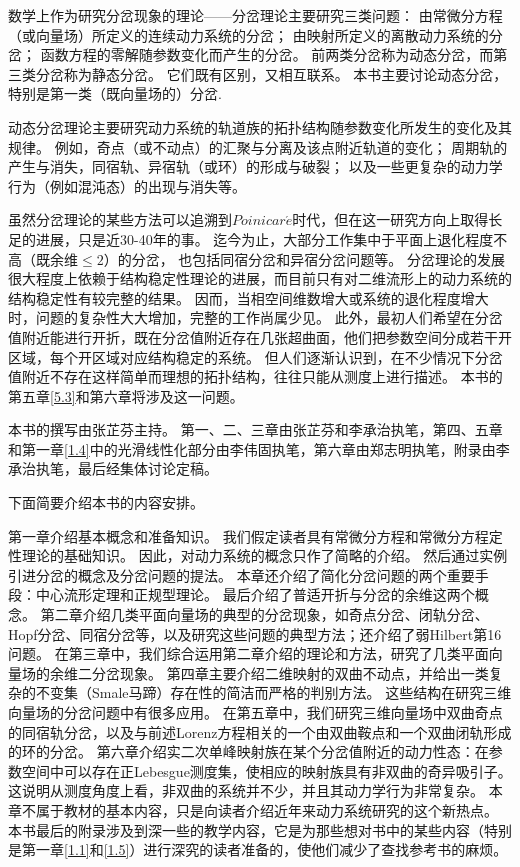 数学上作为研究分岔现象的理论——分岔理论主要研究三类问题：
由常微分方程（或向量场）所定义的连续动力系统的分岔；
由映射所定义的离散动力系统的分岔；
函数方程的零解随参数变化而产生的分岔。
前两类分岔称为动态分岔，而第三类分岔称为静态分岔。
它们既有区别，又相互联系。
本书主要讨论动态分岔，特别是第一类（既向量场的）分岔.


动态分岔理论主要研究动力系统的轨道族的拓扑结构随参数变化所发生的变化及其规律。
例如，奇点（或不动点）的汇聚与分离及该点附近轨道的变化；
周期轨的产生与消失，同宿轨、异宿轨（或环）的形成与破裂；
以及一些更复杂的动力学行为（例如混沌态）的出现与消失等。


虽然分岔理论的某些方法可以追溯到$Poinicar\acute{e}$时代，但在这一研究方向上取得长足的进展，只是近30-40年的事。
迄今为止，大部分工作集中于平面上退化程度不高（既余维\(\leq 2\)）的分岔，
也包括同宿分岔和异宿分岔问题等。
分岔理论的发展很大程度上依赖于结构稳定性理论的进展，而目前只有对二维流形上的动力系统的结构稳定性有较完整的结果。
因而，当相空间维数增大或系统的退化程度增大时，问题的复杂性大大增加，完整的工作尚属少见。
此外，最初人们希望在分岔值附近能进行开折，既在分岔值附近存在几张超曲面，他们把参数空间分成若干开区域，每个开区域对应结构稳定的系统。
但人们逐渐认识到，在不少情况下分岔值附近不存在这样简单而理想的拓扑结构，往往只能从测度上进行描述。
本书的第五章\ref{5.3}和第六章将涉及这一问题。


本书的撰写由张芷芬主持。
第一、二、三章由张芷芬和李承治执笔，第四、五章和第一章\ref{1.4}中的光滑线性化部分由李伟固执笔，第六章由郑志明执笔，附录由李承治执笔，最后经集体讨论定稿。


下面简要介绍本书的内容安排。


第一章介绍基本概念和准备知识。
我们假定读者具有常微分方程和常微分方程定性理论的基础知识。
因此，对动力系统的概念只作了简略的介绍。
然后通过实例引进分岔的概念及分岔问题的提法。
本章还介绍了简化分岔问题的两个重要手段：中心流形定理和正规型理论。
最后介绍了普适开折与分岔的余维这两个概念。
第二章介绍几类平面向量场的典型的分岔现象，如奇点分岔、闭轨分岔、Hopf分岔、同宿分岔等，以及研究这些问题的典型方法；还介绍了弱Hilbert第16问题。
在第三章中，我们综合运用第二章介绍的理论和方法，研究了几类平面向量场的余维二分岔现象。
第四章主要介绍二维映射的双曲不动点，并给出一类复杂的不变集（Smale马蹄）存在性的简洁而严格的判别方法。
这些结构在研究三维向量场的分岔问题中有很多应用。
在第五章中，我们研究三维向量场中双曲奇点的同宿轨分岔，以及与前述Lorenz方程相关的一个由双曲鞍点和一个双曲闭轨形成的环的分岔。
第六章介绍实二次单峰映射族在某个分岔值附近的动力性态：在参数空间中可以存在正Lebesgue测度集，使相应的映射族具有非双曲的奇异吸引子。
这说明从测度角度上看，非双曲的系统并不少，并且其动力学行为非常复杂。
本章不属于教材的基本内容，只是向读者介绍近年来动力系统研究的这个新热点。
本书最后的附录涉及到深一些的教学内容，它是为那些想对书中的某些内容（特别是第一章\ref{1.1}和\ref{1.5}）进行深究的读者准备的，使他们减少了查找参考书的麻烦。


